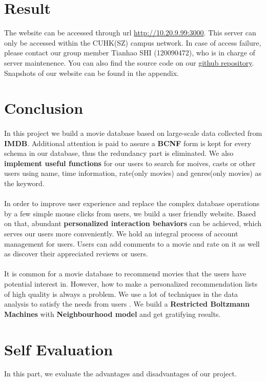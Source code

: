 \begin{CJK*}{UTF8}{gbsn}
\section{Result}
The website can be accessed through url \href{http://10.20.9.99:3000}{http://10.20.9.99:3000}. This server can only be accessed within the CUHK(SZ) campus network. In case of access failure, please contact our group member Tianhao SHI (120090472), who is in charge of server maintenence. You can also find the source code on our \href{https://github.com/warin2020/rotten-potatoes}{github repository}. Snapshots of our website can be found in the appendix.
\section{Conclusion}
\paragraph{} In this project we build a movie database based on large-scale data collected from \textbf{IMDB}. Additional attention is paid to assure a \textbf{BCNF} form is kept for every schema in our database, thus the redundancy part is eliminated. We also \textbf{implement useful functions} for our users to search for moives, casts or other users using name,  time information, rate(only movies) and genres(only movies) as the keyword.
\paragraph{} In order to improve user experience and replace the complex database operations by a few simple mouse clicks from users, we build a user friendly website. Based on that, abundant \textbf{personalized interaction behaviors} can be achieved, which serves our users more conveniently. We hold an integral process of account management for users. Users can add comments to a movie and rate on it as well as discover their appreciated reviews or users.
\paragraph{} It is common for a movie database to recommend movies that the users have potential interest in. However,  how to make a personalized recommendation lists of high quality is always a problem. We use a lot of techniques in the data analysis to satisfy the needs from users . We build a \textbf{Restricted Boltzmann Machines}  with \textbf{Neighbourhood model} and get gratifying results.
\section{Self Evaluation}
In this part, we evaluate the advantages and disadvantages of our project.

\end{CJK*}
